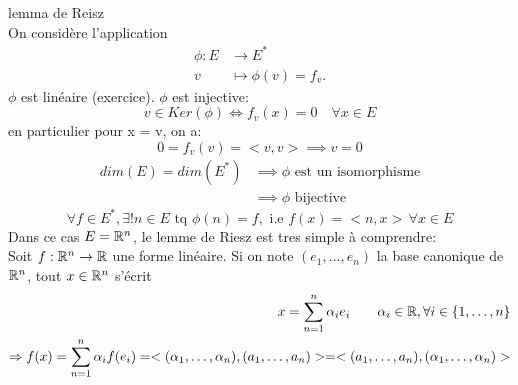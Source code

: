 \begin{explanation} lemma de Reisz\\
   On considère l'application
   \begin{align*}
       \phi: E &\longrightarrow E^* \\
       v &\longmapsto \phi(v) = f_v
   .\end{align*}
   $\phi$ est linéaire (exercice).  $\phi$ est injective:
   \[
   v \in Ker(\phi) \iff f_v(x) = 0 \quad \forall x \in E
   \] 
   en particulier pour x = v, on a:
   \[
   0 = f_v(v) = <v,v> \implies v = 0
   \] 
   \begin{align*}
       dim(E) = dim(E^*) &\implies \phi \text{ est un isomorphisme}\\
                         &\implies \phi \text{ bijective}
   \end{align*}
   \[
   \forall f \in E^*, \exists! n \in E \text{ tq } \phi(n) = f, \text{ i.e } f(x) = <n, x> \, \forall x \in E
   \] 
   Dans ce cas $E = \mathbb{R}^n$, le lemme de Riesz est tres simple à comprendre:\\
   Soit  $f: \mathbb{R}^n \to \mathbb{R}$ une forme linéaire. Si on note $(e_1, \ldots, e_n)$ la base canonique de $\mathbb{R}^n$, tout $x \in \mathbb{R}^n$ s'écrit 
    \begin{align*}
        x = \sum_{n=1}^{n} \alpha_ie_i \qquad \alpha_i \in \mathbb{R}, \forall i \in \{1, \ldots, n\}\\
        \Rightarrow f(x) = \sum_{n=1}^{n} \alpha_if(e_i) = <(\alpha_1, \ldots, \alpha_n), (a_1, \ldots, a_n)> = <(a_1, \ldots, a_n), (\alpha_1, \ldots, \alpha_n)>
   \end{align*}
\end{explanation}
